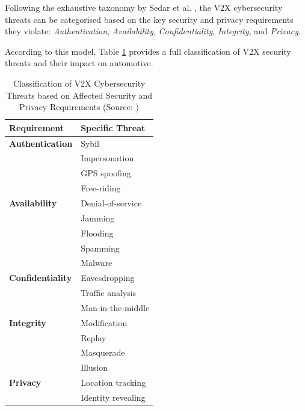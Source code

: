 Following the exhaustive taxonomy by Sedar et al. \cite{V2Xthreats}, the \gls{V2X} cybersecurity threats can be categorised based on the key security and privacy requirements they violate: \textit{Authentication}, \textit{Availability}, \textit{Confidentiality}, \textit{Integrity}, and \textit{Privacy}.

According to this model, Table \ref{tab:v2x_threats} provides a full classification of \gls{V2X} security threats and their impact on automotive.
\newpage
\begin{table}[htbp]
\centering
\begin{tabular}{ll}
\toprule
\textbf{Requirement} & \textbf{Specific Threat} \\
\midrule
\textbf{Authentication} & Sybil \\
                         & Impersonation \\
                         & GPS spoofing \\
                         & Free-riding \\
\midrule
\textbf{Availability}   & Denial-of-service \\
                         & Jamming \\
                         & Flooding \\
                         & Spamming \\
                         & Malware \\
\midrule
\textbf{Confidentiality} & Eavesdropping \\
                         & Traffic analysis \\
                         & Man-in-the-middle \\
\midrule
\textbf{Integrity}       & Modification \\
                         & Replay \\
                         & Masquerade \\
                         & Illusion \\
\midrule
\textbf{Privacy}         & Location tracking \\
                         & Identity revealing \\
\bottomrule
\end{tabular}
\caption[Classification of V2X Cybersecurity Threats based on Affected Security and Privacy Requirements]{Classification of V2X Cybersecurity Threats based on Affected Security and Privacy Requirements (Source: \cite{V2Xthreats})}
\label{tab:v2x_threats}
\end{table}


